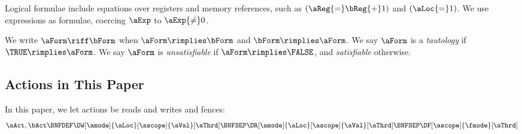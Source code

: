 Logical formulae include equations over registers and memory references, such as
$(\aReg{=}\bReg{+}1)$ and $(\aLoc{=}1)$.
We use expressions as formulae, coercing $\aExp$ to $\aExp{\neq}0$.


We write $\aForm\riff\bForm$ when $\aForm\rimplies\bForm$ and $\bForm\rimplies\aForm$.
We say
$\aForm$ is a \emph{tautology} if $\TRUE \rimplies \aForm$.
We say
$\aForm$ is \emph{unsatisfiable} if $\aForm \rimplies \FALSE$, and
\emph{satisfiable} otherwise.




\subsection{Actions in This Paper}
\label{sec:actions}
In this paper, we let actions be reads and writes and fences:
\begin{displaymath}
  \aAct,\bAct \BNFDEF \DW[\amode]{\aLoc}[\ascope]{\aVal}[\aThrd]
  \BNFSEP \DR[\amode]{\aLoc}[\ascope]{\aVal}[\aThrd]
  \BNFSEP \DF[\ascope]{\fmode}[\aThrd]
\end{displaymath}

